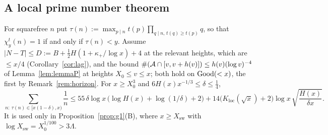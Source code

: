 \subsection{A local prime number theorem}\label{sec:noise-lp}

\begin{lemma}\label{lem:threshold-mass}
For squarefree $n$ put $\tau(n):=\max_{p\mid n}t(p)\prod_{q\mid n,\,t(q)\ge t(p)}q$, so that $\chi^t_y(n)=1$ if and only if
$\tau(n)<y$. Assume $|N-T|\le D:=B+\frac12H(1+\kappa_+/\log x)+4$ at the relevant heights, which are $\le x/4$
(Corollary~\ref{cor:lag}), and the bound $\#(\mathcal{A}\cap[v,v+h(v)])\le h(v)(\log v)^{-4}$ of Lemma~\ref{lem:lemmaP} at heights
$X_0\le v\le x$; both hold on $\mathrm{Good}(<x)$, the first by Remark~\ref{rem:horizon}.
For $x\ge X_0^3$ and
$6H(x)x^{-1/3}\le\delta\le\frac14$,
\[
  \sum_{n:\ \tau(n)\in[x(1-\delta),x)}\frac1n\le55\,\delta\log x\,\big(\log H(x)+\log(1/\delta)+2\big)
  +14\big(K_{\mathrm{loc}}(\sqrt x)+2\big)\log x\,\sqrt{\frac{H(x)}{\delta x}} .
\]
It is used only in Proposition~\ref{prop:g1}(B), where $x\ge X_{\mathrm{sw}}$ with $\log X_{\mathrm{sw}}=X_0^{1/100}>3\Lambda$.
\end{lemma}

